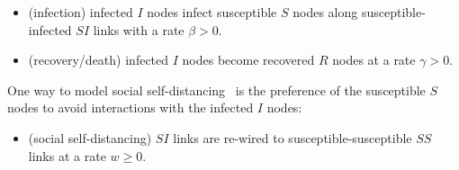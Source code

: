 \documentclass[12pt]{article}
\begin{document}
\begin{itemize}
 \item (infection) infected $I$ nodes infect susceptible $S$ nodes along susceptible-infected $SI$ links with a rate $\beta>0$.
 \item (recovery/death) infected $I$ nodes become recovered $R$ nodes at a rate $\gamma>0$. 
\end{itemize}
 
One way to model social self-distancing~\cite{GrossDLimaBlasius,ShawSchwartz} is the preference of the susceptible $S$ nodes to avoid interactions with the infected $I$ nodes:

\begin{itemize}
 \item (social self-distancing) $SI$ links are re-wired to susceptible-susceptible $SS$ links at a rate $w\geq 0$.
\end{itemize}
\end{document}
